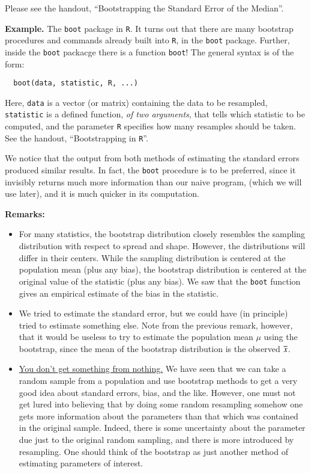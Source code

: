 \documentclass[captions=tableheading]{scrbook}
\begin{document}
 

Please see the handout, ``Bootstrapping the Standard Error of the Median''.  


 

\textbf{Example.} The \texttt{boot} package in \texttt{R}. It turns out that there are many bootstrap procedures and commands already built into \texttt{R}, in the \texttt{boot} package. Further, inside the \texttt{boot} packacge there is a function \texttt{boot}! The general syntax is of the form:

\begin{verbatim}
  boot(data, statistic, R, ...)
\end{verbatim}


Here, \texttt{data} is a vector (or matrix) containing the data to be resampled, \texttt{statistic} is a defined function, \emph{of two arguments}, that tells which statistic to be computed, and the parameter \texttt{R} specifies how many resamples should be taken. See the handout, ``Bootstrapping in \texttt{R}''.

 

We notice that the output from both methods of estimating the standard errors produced similar results. In fact, the \texttt{boot} procedure is to be preferred, since it invisibly returns much more information than our naive program, (which we will use later), and it is much quicker in its computation.  


\textbf{Remarks:}

\begin{itemize}
\item For many statistics, the bootstrap distribution closely resembles the sampling distribution with respect to spread and shape. However, the distributions will differ in their centers. While the sampling distribution is centered at the population mean (plus any bias), the bootstrap distribution is centered at the original value of the statistic (plus any bias). We saw that the \texttt{boot} function gives an empirical estimate of the bias in the statistic.
\item We tried to estimate the standard error, but we could have (in principle) tried to estimate something else. Note from the previous remark, however, that it would be useless to try to estimate the population mean $\mu$ using the bootstrap, since the mean of the bootstrap distribution is the observed $\overline{x}$.
\item \underline{You don't get something from nothing.} We have seen that we can take a random sample from a population and use bootstrap methods to get a very good idea about standard errors, bias, and the like. However, one must not get lured into believing that by doing some random resampling somehow one gets more information about the parameters than that which was contained in the original sample. Indeed, there is some uncertainty about the parameter due just to the original random sampling, and there is more introduced by resampling. One should think of the bootstrap as just another method of estimating parameters of interest.
\end{itemize}
\end{document}
